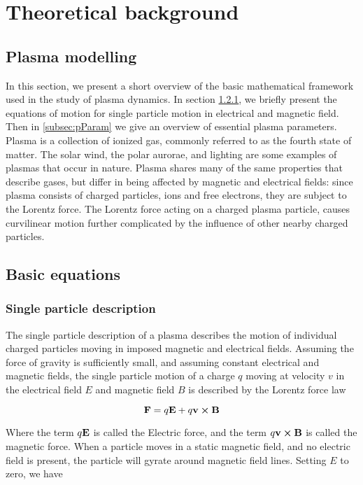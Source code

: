 \chapter{Theoretical background}

\label{sec:theory}

\section{Plasma modelling}
In this section, we present a short overview of the basic mathematical framework used in the study of plasma dynamics. In section \cref{subsec:basicEq}, we briefly present the equations of motion for single particle motion in electrical and magnetic field. Then in \cref{subsec:pParam} we give an overview of essential plasma parameters.
Plasma is a collection of ionized gas, commonly referred to as the fourth state of matter. The solar wind, the polar aurorae, and lighting are some examples of plasmas that occur in nature.  Plasma shares many of the same properties that describe gases, but differ in being affected by magnetic and electrical fields: since plasma consists of charged particles, ions and free electrons, they are subject to the Lorentz force. The Lorentz force acting on a charged plasma particle, causes curvilinear motion further complicated by the influence of other nearby charged particles.

\section{Basic equations}

\subsection{Single particle description}
\label{subsec:basicEq}
The single particle description of a plasma describes the motion of individual charged particles moving in imposed magnetic and electrical fields. Assuming the force of gravity is sufficiently small, and assuming constant electrical and magnetic fields, the single particle motion of a charge $q$ moving at velocity $v$ in the electrical field $E$ and magnetic field $B$ is described by the Lorentz force law 

\begin{equation}\label{eq:lorentz}
    \vb{F} = q \vb{E} + q \vb{v} \cross \vb{B}
\end{equation}

Where the term $q \vb{E}$ is called the Electric force, and the term $q\vb{v} \cross \vb{B}$ is called the magnetic force. When a particle moves in a static magnetic field, and no electric field is present, the particle will gyrate around magnetic field lines. Setting $E$ to zero, we have


